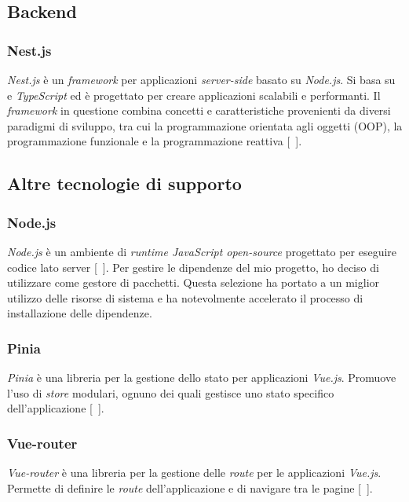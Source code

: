\subsection{Backend}\label{subsec:backend}
\subsubsection{Nest.js}\label{subsubsec:nest-js}
\textit{Nest.js} è un \textit{framework} per applicazioni \textit{server-side} basato su \textit{Node.js}. Si basa su  e \textit{TypeScript} ed è progettato per creare applicazioni scalabili e performanti.
Il \textit{framework} in questione combina concetti e caratteristiche provenienti da diversi paradigmi di sviluppo, tra cui la programmazione orientata agli oggetti (OOP), la programmazione funzionale e la programmazione reattiva [~\cite{site:nest.js}].

\subsection{Altre tecnologie di supporto}\label{subsec:altre-tecnologie-di-supporto}
\subsubsection{Node.js}\label{subsubsec:node-js}
\textit{Node.js} è un ambiente di \textit{runtime JavaScript open-source} progettato per eseguire codice lato server [~\cite{site:node}]. Per gestire le dipendenze del mio progetto,
ho deciso di utilizzare  come gestore di pacchetti. Questa selezione ha portato a un miglior utilizzo delle risorse di sistema e ha notevolmente accelerato il processo di 
installazione delle dipendenze.
\subsubsection{Pinia}\label{subsubsec:pinia}
\textit{Pinia} è una libreria per la gestione dello stato per applicazioni \textit{Vue.js}. Promuove l'uso di \textit{store} modulari, ognuno dei quali gestisce uno stato specifico dell'applicazione [~\cite{site:pinia}].
\subsubsection{Vue-router}\label{subsubsec:vue-router}
\textit{Vue-router} è una libreria per la gestione delle \textit{route} per le applicazioni \textit{Vue.js}. Permette di definire le \textit{route} dell'applicazione e di navigare tra le pagine [~\cite{site:vue-router}].

